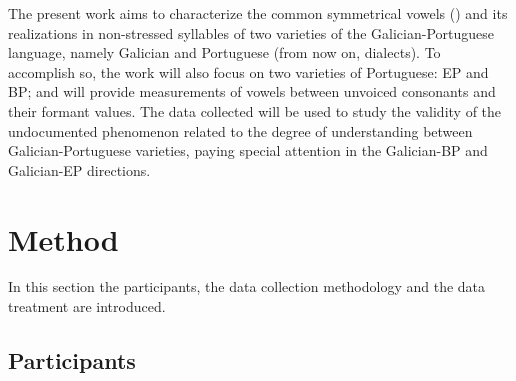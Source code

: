 \documentclass[a4paper,11pt]{article}
\begin{document}
    The present work aims to characterize the common symmetrical vowels () and its realizations in non-stressed syllables of two varieties  of the Galician-Portuguese language, namely Galician and Portuguese (from now on, dialects). To accomplish so, the work will also focus on two varieties of Portuguese: EP and BP; and will provide measurements of vowels between unvoiced consonants and their formant values. The data collected will be used to study the validity of the undocumented phenomenon related to the degree of understanding between Galician-Portuguese varieties, paying special attention in the Galician-BP and Galician-EP directions.
    
    
    \section{Method}
    In this section the participants, the data collection methodology and the data treatment are introduced.
    
    \subsection{Participants}
    
\end{document}
